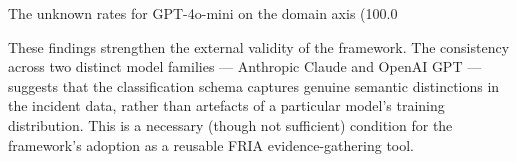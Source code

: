 The unknown rates for GPT-4o-mini on the domain axis (100.0%

These findings strengthen the external validity of the framework. The consistency across two distinct model families --- Anthropic Claude and OpenAI GPT --- suggests that the classification schema captures genuine semantic distinctions in the incident data, rather than artefacts of a particular model's training distribution. This is a necessary (though not sufficient) condition for the framework's adoption as a reusable FRIA evidence-gathering tool.
